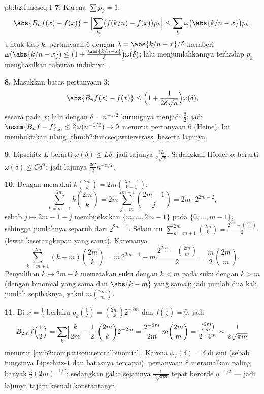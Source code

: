 \begin{solution}{pb:b2:funcseq:1}
\textbf{7.} Karena $\sum p_k = 1$:
\[
\abs{B_nf(x) - f(x)}
= \Bigl|\sum_k\bigl(f(k/n) - f(x)\bigr)p_k\Bigr|
\leq \sum_k\omega\bigl(\abs{k/n - x}\bigr)p_k .
\]
Untuk tiap $k$, pertanyaan 6 dengan $\lambda = \abs{k/n - x}/\delta$
memberi $\omega(\abs{k/n-x}) \leq \bigl(1 +
\frac{\abs{k/n-x}}\delta\bigr)\omega(\delta)$; lalu menjumlahkannya
terhadap $p_k$ menghasilkan taksiran induknya.

\textbf{8.} Masukkan batas pertanyaan 3:
\[
\abs{B_nf(x) - f(x)} \leq \Bigl(1 +
\frac{1}{2\delta\sqrt n}\Bigr)\omega(\delta),
\]
secara  pada $x$; lalu dengan $\delta = n^{-1/2}$ kurungnya
menjadi $\frac32$: jadi $\norm{B_nf - f}_\infty \leq
\frac32\omega(n^{-1/2}) \to 0$ menurut pertanyaan 6 (Heine). Ini
membuktikan ulang \cref{thm:b2:funcseq:weierstrass} beserta lajunya.

\textbf{9.} Lipschitz-$L$ berarti $\omega(\delta) \leq L\delta$:
jadi lajunya $\frac{3L}{2\sqrt n}$. Sedangkan Hölder-$\alpha$ berarti
$\omega(\delta) \leq C\delta^\alpha$: jadi lajunya $\frac{3C}{2}
n^{-\alpha/2}$.

\textbf{10.} Dengan memakai $k\binom{2m}k = 2m\binom{2m-1}{k-1}$:
\[
\sum_{k=m+1}^{2m}k\binom{2m}k
= 2m\sum_{j=m}^{2m-1}\binom{2m-1}{j}
= 2m\cdot 2^{2m-2},
\]
sebab $j \mapsto 2m-1-j$ membijeksikan $\{m,\dots,2m-1\}$ pada
$\{0,\dots,m-1\}$, sehingga jumlahnya separuh dari $2^{2m-1}$. Selain
itu $\sum_{k=m+1}^{2m}\binom{2m}k = \frac{2^{2m} -
\binom{2m}m}{2}$ (lewat kesetangkupan yang sama). Karenanya
\[
\sum_{k=m+1}^{2m}(k-m)\binom{2m}k
= m\,2^{2m-1} - m\,\frac{2^{2m} - \binom{2m}m}{2}
= \frac m2\binom{2m}m .
\]
Penyulihan $k \mapsto 2m-k$ memetakan suku dengan $k < m$
pada suku dengan $k > m$ (dengan binomial yang sama dan $\abs{k-m}$ yang
sama): jadi jumlah  dua kali jumlah sepihaknya, yakni $m\binom{2m}m$.

\textbf{11.} Di $x = \frac12$ berlaku $p_k(\tfrac12) =
\binom{2m}k2^{-2m}$ dan $f(\tfrac12) = 0$, jadi
\[
B_{2m}f\Bigl(\frac12\Bigr)
= \sum_k\Bigl|\frac{k}{2m} - \frac12\Bigr|
\binom{2m}k 2^{-2m}
= \frac{2^{-2m}}{2m}\,m\binom{2m}m
= \frac{\binom{2m}m}{2\cdot4^m}
\sim \frac{1}{2\sqrt{\pi m}}
\]
menurut \cref{ex:b2:comparison:centralbinomial}. Karena $\omega_f
(\delta) = \delta$ di sini (sebab fungsinya Lipschitz-$1$ dan
batasnya tercapai), pertanyaan 8 meramalkan paling banyak
$\frac32(2m)^{-1/2}$: sedangkan galat sejatinya $\frac{1}{2\sqrt{\pi m}}$
tepat berorde $n^{-1/2}$ --- jadi lajunya tajam kecuali
konstantanya.


\end{solution}
